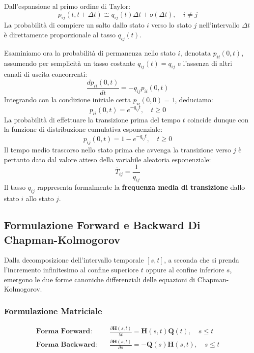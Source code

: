 \documentclass[11pt, a4paper]{article}
\begin{document}

Dall'espansione al primo ordine di Taylor:
\[
    p_{ij}(t, t + \Delta t) \cong q_{ij}(t) \Delta t + o(\Delta t), \quad i \neq j
\]
La probabilità di compiere un salto dallo stato $i$ verso lo stato $j$ nell'intervallo $\Delta t$ è direttamente proporzionale al tasso $q_{ij}(t)$.

Esaminiamo ora la probabilità di permanenza nello stato $i$, denotata $p_{ii}(0, t)$, assumendo per semplicità un tasso costante $q_{ij}(t) = q_{ij}$ e l'assenza di altri canali di uscita concorrenti:
\[
    \frac{d p_{ii}(0, t)}{dt} = -q_{ij} p_{ii}(0, t)
\]
Integrando con la condizione iniziale certa $p_{ii}(0, 0) = 1$, deduciamo:
\[
    \boxed{p_{ii}(0, t) = e^{-q_{ij} t}, \quad t \ge 0}
\]
La probabilità di effettuare la transizione prima del tempo $t$ coincide dunque con la funzione di distribuzione cumulativa esponenziale:
\[
    p_{ij}(0, t) = 1 - e^{-q_{ij} t}, \quad t \ge 0
\]
Il tempo medio trascorso nello stato prima che avvenga la transizione verso $j$ è pertanto dato dal valore atteso della variabile aleatoria esponenziale:
\[
    \boxed{\bar{T}_{ij} = \frac{1}{q_{ij}}}
\]
Il tasso $q_{ij}$ rappresenta formalmente la \textbf{frequenza media di transizione} dallo stato $i$ allo stato $j$.

\subsection{Formulazione Forward e Backward Di Chapman-Kolmogorov}

Dalla decomposizione dell'intervallo temporale $[s, t]$, a seconda che si prenda l'incremento infinitesimo al confine superiore $t$ oppure al confine inferiore $s$, emergono le due forme canoniche differenziali delle equazioni di Chapman-Kolmogorov.

\subsubsection{Formulazione Matriciale}
\begin{align}
    \textbf{Forma Forward:} \quad &\boxed{\frac{\partial \bm{H}(s, t)}{\partial t} = \bm{H}(s, t) \bm{Q}(t), \quad s \le t} \label{eq:CK_mat_fwd} \\
    \textbf{Forma Backward:} \quad &\boxed{\frac{\partial \bm{H}(s, t)}{\partial s} = -\bm{Q}(s) \bm{H}(s, t), \quad s \le t} \label{eq:CK_mat_bwd}
\end{align}
\end{document}
